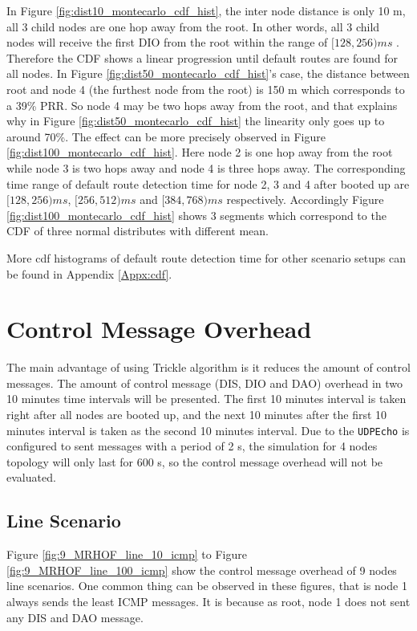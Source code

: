 In Figure \ref{fig:dist10_montecarlo_cdf_hist}, the inter node distance is only 10 m, all 3 child nodes are one hop away from the root. In other words, all 3 child nodes will receive the first DIO from the root within the range of $[128, 256) ms$ . Therefore the CDF shows a linear progression until default routes are found for all nodes. In Figure \ref{fig:dist50_montecarlo_cdf_hist}\@'s case, the distance between root and node 4 (the furthest node from the root) is 150 m which corresponds to a 39\% PRR. So node 4 may be two hops away from the root, and that explains why in Figure \ref{fig:dist50_montecarlo_cdf_hist} the linearity only goes up to around 70\%. The effect can be more precisely observed in Figure \ref{fig:dist100_montecarlo_cdf_hist}. Here node 2 is one hop away from the root while node 3 is two hops away and node 4 is three hops away. The corresponding time range of default route detection time for node 2, 3 and 4 after booted up are $[128, 256) ms$, $[256, 512) ms$ and $[384, 768) ms$ respectively. Accordingly Figure \ref{fig:dist100_montecarlo_cdf_hist} shows 3 segments which correspond to the CDF of three normal distributes with different mean.
\newline

More cdf histograms of default route detection time for other scenario setups can be found in Appendix \ref{Appx:cdf}. 

\section{Control Message Overhead}
\label{ICMP}
The main advantage of using Trickle algorithm is it reduces the amount of control messages. The amount of control message (DIS, DIO and DAO) overhead in two 10 minutes time intervals will be presented. The first 10 minutes interval is taken right after all nodes are booted up, and the next 10 minutes after the first 10 minutes interval is taken as the second 10 minutes interval. Due to the \texttt{UDPEcho} is configured to sent messages with a period of 2 s, the simulation for 4 nodes topology will only last for 600 s, so the control message overhead will not be evaluated. 

\subsection{Line Scenario}
\label{icmp:line}
Figure \ref{fig:9_MRHOF_line_10_icmp} to Figure \ref{fig:9_MRHOF_line_100_icmp} show the control message overhead  of 9 nodes line scenarios. One common thing can be observed in these figures, that is node 1 always sends the least ICMP messages. It is because as root, node 1 does not sent any DIS and DAO message.
\newline

